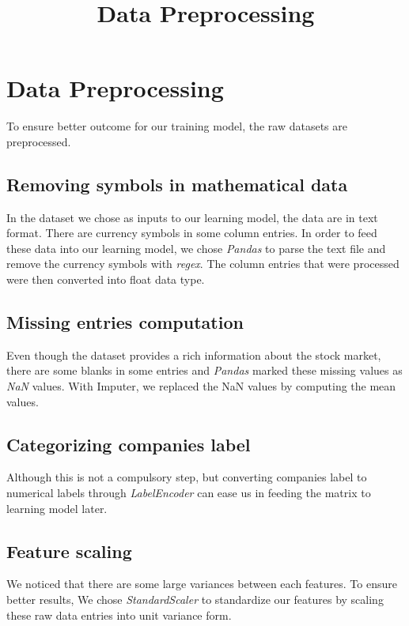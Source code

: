 \documentclass{article}
\title{Data Preprocessing}
\author{
  Shi Ji Chew, Josh McGrath, Eli Schlossberg\thanks
  CS 532 Fall 2017\\
  Department of Computer Science\\
  University of Wisconsin-Madison\\
  Madison, WI 53703 \\
  \texttt{schew2@wisc.edu} \\
}
\begin{document}

\maketitle

\section{Data Preprocessing}

To ensure better outcome for our training model, the raw datasets are preprocessed.

\subsection{Removing symbols in mathematical data}
In the dataset we chose as inputs to our learning model, the data are in text format. There are currency symbols in some column entries. In order to feed these data into our learning model, we chose \emph{Pandas} to parse the text file and remove the currency symbols with \emph{regex}. The column entries that were processed were then converted into float data type.

\subsection{Missing entries computation}
Even though the dataset provides a rich information about the stock market, there are some blanks in some entries and \emph{Pandas} marked these missing values as \emph{NaN} values. With Imputer, we replaced the NaN values by computing the mean values.

\subsection{Categorizing companies label}
Although this is not a compulsory step, but converting companies label to numerical labels through \emph{LabelEncoder} can ease us in feeding the matrix to learning model later.

\subsection{Feature scaling}

We noticed that there are some large variances between each features. To ensure better results, We chose \emph{StandardScaler} to standardize our features by scaling these raw data entries into unit variance form.
\end{document}
